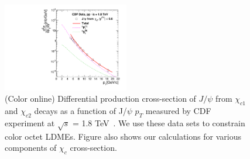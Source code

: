 \documentclass[aps,prc,preprint,superscriptaddress,showpacs,showkeys,amsmath]{revtex4-1}
\begin{document}
\begin{figure}
\includegraphics[width=0.49\textwidth]{Figures/Chic/Chic1_CDF_Fit.pdf}
\caption{(Color online) Differential production cross-section of $J/\psi$ from
$\chi_{c1}$ and $\chi_{c2}$ decays as a function of J/$\psi\,\,p_{T}$ measured by
CDF experiment at $\sqrt{s}$ = 1.8 TeV~\cite{Abe:1997yz}. 
We use these data sets to constrain color octet LDMEs. Figure also shows our 
calculations for various components 
of $\chi_{c}$ cross-section.}
\label{Fig:LDMEChicCDF}
\end{figure}
\end{document}
